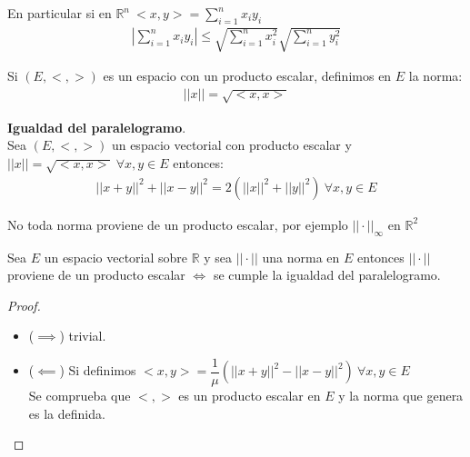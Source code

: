 	\begin{observacion}En particular si en $\mathbb{R}^n\ <x,y>=\sum^n_{i=1}x_iy_i$
		\begin{align*}
			\left|\sum^n_{i=1}x_iy_i\right|\leq \sqrt{\sum^n_{i=1}x_i^2}\sqrt{\sum^n_{i=1}y_i^2}
		\end{align*}	
	\end{observacion}
	
	\begin{defi} Si $(E, <,>)$ es un espacio con un producto escalar, definimos en $E$ la norma:
		\begin{align*}
			||x||=\sqrt{<x,x>}
		\end{align*}	
	\end{defi}	
	
	\begin{teor} \textbf{Igualdad del paralelogramo}. \\
		Sea $(E,<,>)$ un espacio vectorial con producto escalar y $||x||=\sqrt{<x,x>}\ \forall x,y\in E$ entonces:
		\begin{align*}
			||x+y||^2+||x-y||^2=2(||x||^2+||y||^2)\ \forall x,y \in E
		\end{align*}	
	\end{teor}
	
	\begin{observacion}No toda norma proviene de un producto escalar, por ejemplo $||\cdot||_\infty$ en $\mathbb{R}^2$
	\end{observacion}

	\begin{proposicion}Sea $E$ un espacio vectorial sobre $\mathbb{R}$ y sea $||\cdot||$ una norma en $E$ entonces $||\cdot||$ proviene de un producto escalar $\iff$ se cumple la igualdad del paralelogramo.
		\begin{proof} \ 
			\begin{itemize}
				\item ($\implies$)  trivial.
				\item ($\impliedby$)  Si definimos $<x,y> = \dfrac{1}{\mu}(||x+y||^2-||x-y||^2)\ \forall x,y 						\in E$ \\
					Se comprueba que $<,>$ es un producto escalar en $E$ y la norma que genera es la 							definida.
			\end{itemize}
		\end{proof}
	\end{proposicion}